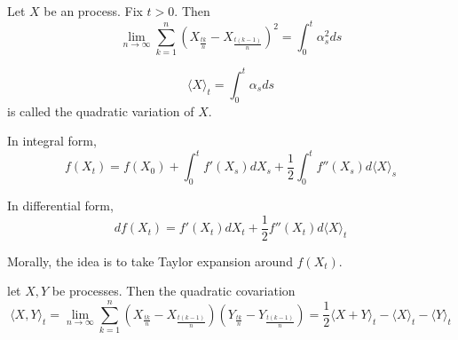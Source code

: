 \begin{thm}
  \label{defn:continuous_time:12}
  Let $X$ be an \ito process.  Fix $t > 0$.  Then
  \begin{equation}
    \label{eq:40}
    \lim_{n \rightarrow \infty} \sum_{k=1}^{n} \left(X_{\frac{tk}{n}}
      - X_{\frac{t(k-1)}{n}}\right)^{2} = \int_{0}^{t} \alpha_{s}^{2} ds
  \end{equation}
\end{thm}

\begin{notation}
  \begin{equation}
    \label{eq:41}
    \langle X \rangle_{t} = \int_{0}^{t} \alpha_{s} ds
  \end{equation} is called the quadratic variation of $X$.
\end{notation}

\begin{thm}
  \label{defn:continuous_time:13}
  In integral form,
  \begin{equation}
    \label{eq:42}
    f(X_{t}) = f(X_{0}) + \int_{0}^{t} f'(X_{s}) dX_{s} + \frac{1}{2}
    \int_{0}^{t} f''(X_{s}) d \langle X \rangle_{s}
  \end{equation}

  In differential form,
  \begin{equation}
    \label{eq:43}
    df(X_{t}) = f'(X_{t}) dX_{t} + \frac{1}{2} f''(X_{t}) d\langle X \rangle_{t}
  \end{equation}
\end{thm}

Morally, the idea is to take Taylor expansion around $f(X_{t})$.

\begin{thm}
  \label{defn:continuous_time:14}
  let $X, Y$ be \ito processes. Then the quadratic covariation
  \begin{equation}
    \label{eq:44}
    \langle
    X, Y \rangle_{t} = \lim_{n \rightarrow \infty} \sum_{k=1}^{n}
    (X_{\frac{tk}{n}} - X_{\frac{t(k-1)}{n}})(Y_{\frac{tk}{n}} -
    Y_{\frac{t(k-1)}{n}}) = \frac{1}{2} \langle X + Y \rangle_{t} -
    \langle X \rangle_{t} - \langle Y \rangle_{t}
  \end{equation}
\end{thm}

